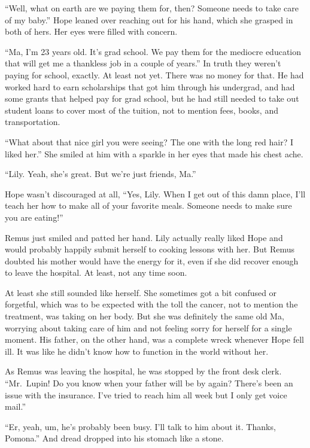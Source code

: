 \documentclass[12pt,twoside,openright]{memoir}
\begin{document}
``Well, what on earth are we paying them for, then? Someone needs to take care of my baby.'' Hope leaned over reaching out for his hand, which she grasped in both of hers. Her eyes were filled with concern. 

``Ma, I'm 23 years old. It's grad school. We pay them for the mediocre education that will get me a thankless job in a couple of years.'' In truth they weren't paying for school, exactly. At least not yet. There was no money for that. He had worked hard to earn scholarships that got him through his undergrad, and had some grants that helped pay for grad school, but he had still needed to take out student loans to cover most of the tuition, not to mention fees, books, and transportation. 

``What about that nice girl you were seeing? The one with the long red hair? I liked her.'' She smiled at him with a sparkle in her eyes that made his chest ache. 

``Lily. Yeah, she's great. But we're just friends, Ma.'' 

Hope wasn't discouraged at all, ``Yes, Lily. When I get out of this damn place, I'll teach her how to make all of your favorite meals. Someone needs to make sure you are eating!'' 

Remus just smiled and patted her hand. Lily actually really liked Hope and would probably happily submit herself to cooking lessons with her. But Remus doubted his mother would have the energy for it, even if she did recover enough to leave the hospital. At least, not any time soon.

At least she still sounded like herself. She sometimes got a bit confused or forgetful, which was to be expected with the toll the cancer, not to mention the treatment, was taking on her body. But she was definitely the same old Ma, worrying about taking care of him and not feeling sorry for herself for a single moment. His father, on the other hand, was a complete wreck whenever Hope fell ill. It was like he didn't know how to function in the world without her. 

As Remus was leaving the hospital, he was stopped by the front desk clerk. ``Mr.\ Lupin! Do you know when your father will be by again? There's been an issue with the insurance. I've tried to reach him all week but I only get voice mail.''

``Er, yeah, um, he's probably been busy. I'll talk to him about it. Thanks, Pomona.'' And dread dropped into his stomach like a stone. 
\end{document}
